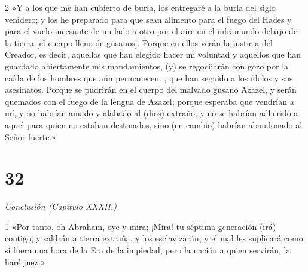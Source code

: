 \par 2 »Y a los que me han cubierto de burla, los entregaré a la burla del siglo venidero; y los he preparado para que sean alimento para el fuego del Hades y para el vuelo incesante de un lado a otro por el aire en el inframundo debajo de la tierra [el cuerpo lleno de gusanos]. Porque en ellos verán la justicia del Creador, es decir, aquellos que han elegido hacer mi voluntad y aquellos que han guardado abiertamente mis mandamientos, (y) se regocijarán con gozo por la caída de los hombres que aún permanecen. , que han seguido a los ídolos y sus asesinatos. Porque se pudrirán en el cuerpo del malvado gusano Azazel, y serán quemados con el fuego de la lengua de Azazel; porque esperaba que vendrían a mí, y no habrían amado y alabado al (dios) extraño, y no se habrían adherido a aquel para quien no estaban destinados, sino (en cambio) habrían abandonado al Señor fuerte.»

\chapter{32}

\par \textit{Conclusión (Capítulo XXXII.)}

\par 1 «Por tanto, oh Abraham, oye y mira; ¡Mira! tu séptima generación (irá) contigo, y saldrán a tierra extraña, y los esclavizarán, y el mal les suplicará como si fuera una hora de la Era de la impiedad, pero la nación a quien servirán, la haré juez.»

